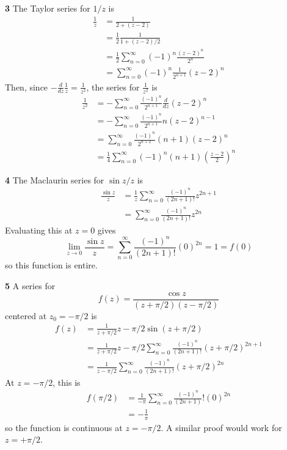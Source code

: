 \documentclass{article}
\begin{document}
\textbf{3}
The Taylor series for $1/z$ is
\begin{align*}
	\frac{1}{z}
	&= \frac{1}{2 + (z - 2)} \\
	&= \frac{1}{2} \frac{1}{1 + (z - 2)/2} \\
	&= \frac{1}{2} \sum_{n=0}^\infty (-1)^n \frac{(z - 2)^n}{2^n} \\
	&= \sum_{n=0}^\infty (-1)^n \frac{1}{2^{n+1}} (z - 2)^n
\end{align*}
Then, since $-\frac{d}{dz} \frac{1}{z} = \frac{1}{z^2}$, the series for $\frac{1}{z^2}$ is
\begin{align*}
	\frac{1}{z^2}
	&= -\sum_{n=0}^\infty \frac{(-1)^n}{2^{n+1}} \frac{d}{dz} (z - 2)^n \\
	&= -\sum_{n=0}^\infty \frac{(-1)^n}{2^{n+1}} n(z - 2)^{n-1} \\
	&= \sum_{n=0}^\infty \frac{(-1)^n}{2^{n+2}} (n+1) (z - 2)^n \\
	&= \frac{1}{4} \sum_{n=0}^\infty (-1)^n (n+1) \left( \frac{z - 2}{2} \right)^n
\end{align*}

\textbf{4}
The Maclaurin series for $\sin z / z$ is
\begin{align*}
	\frac{\sin z}{z}
	&= \frac{1}{z} \sum_{n=0}^\infty \frac{(-1)^n}{(2n + 1)!} z^{2n+1} \\
	&= \sum_{n=0}^\infty \frac{(-1)^n}{(2n + 1)!} z^{2n}
\end{align*}
Evaluating this at $z = 0$ gives
\[
	\lim_{z \to 0} \frac{\sin z}{z}
	= \sum_{n=0}^\infty \frac{(-1)^n}{(2n + 1)!} (0)^{2n}
	= 1
	= f(0)
\]
so this function is entire.

\textbf{5}
A series for 
\[
	f(z) = \frac{\cos z}{(z + \pi/2)(z - \pi/2)}
\]
centered at $z_0 = -\pi/2$ is
\begin{align*}
	f(z)
	&= \frac{1}{z + \pi/2}{z - \pi/2} \sin(z + \pi/2) \\
	&= \frac{1}{z + \pi/2}{z - \pi/2} \sum_{n=0}^\infty \frac{(-1)^n}{(2n+1)!} (z + \pi/2)^{2n+1} \\
	&= \frac{1}{z - \pi/2} \sum_{n=0}^\infty \frac{(-1)^n}{(2n+1)!} (z + \pi/2)^{2n}
\end{align*}
At $z = -\pi/2$, this is
\begin{align*}
	f(\pi/2) 
	&= \frac{1}{-\pi} \sum_{n=0}^\infty \frac{(-1)^n}{(2n+1)}! (0)^{2n} \\
	&= -\frac{1}{\pi}
\end{align*}
so the function is continuous at $z = -\pi/2$. A similar proof would work for $z = +\pi/2$.
\end{document}
